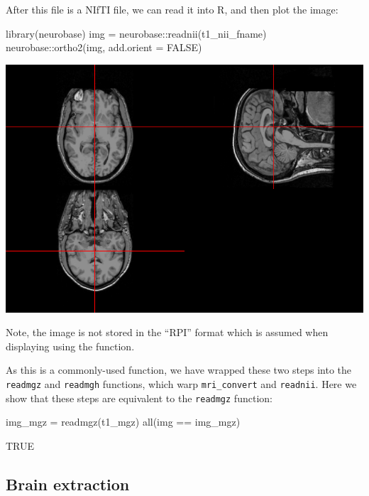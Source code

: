 After this file is a NIfTI file, we can read it into R, and then plot
the image:

\begin{Schunk}
\begin{Sinput}
library(neurobase)
img = neurobase::readnii(t1_nii_fname)
neurobase::ortho2(img, add.orient = FALSE)
\end{Sinput}

\includegraphics{Freesurfer_files/figure-latex/mri_plot-1} \end{Schunk}

Note, the image is not stored in the ``RPI'' format which is assumed
when displaying using the   function.

As this is a commonly-used function, we have wrapped these two steps
into the \texttt{readmgz} and \texttt{readmgh} functions, which warp
\texttt{mri\_convert} and \texttt{readnii}. Here we show that these
steps are equivalent to the \texttt{readmgz} function:

\begin{Schunk}
\begin{Sinput}
img_mgz = readmgz(t1_mgz)
all(img == img_mgz)
\end{Sinput}
\begin{Soutput}
[1] TRUE
\end{Soutput}
\end{Schunk}

\subsection{Brain extraction}\label{brain-extraction}


